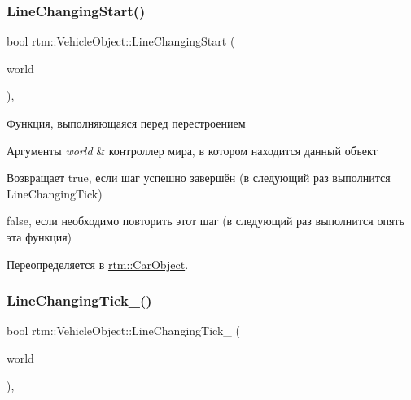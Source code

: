 \subsubsection{\texorpdfstring{Line\+Changing\+Start()}{LineChangingStart()}}
{\footnotesize\ttfamily bool rtm\+::\+Vehicle\+Object\+::\+Line\+Changing\+Start (\begin{DoxyParamCaption}\item[{\hyperlink{classrtm_1_1_world_controller}{World\+Controller} $\ast$const}]{world }\end{DoxyParamCaption})\hspace{0.3cm}{\ttfamily [protected]}, {\ttfamily [virtual]}}

Функция, выполняющаяся перед перестроением 
\begin{DoxyParams}{Аргументы}
{\em world} & контроллер мира, в котором находится данный объект \\
\hline
\end{DoxyParams}
\begin{DoxyReturn}{Возвращает}
true, если шаг успешно завершён (в следующий раз выполнится Line\+Changing\+Tick) 

false, если необходимо повторить этот шаг (в следующий раз выполнится опять эта функция) 
\end{DoxyReturn}


Переопределяется в \hyperlink{classrtm_1_1_car_object_a34063664a03d36d1308c80e064d1ae61}{rtm\+::\+Car\+Object}.

\mbox{\label{classrtm_1_1_vehicle_object_ad14f2e164f2105fbae0c982cec4aff9a}} 
\subsubsection{\texorpdfstring{Line\+Changing\+Tick\+\_\+()}{LineChangingTick\_()}}
{\footnotesize\ttfamily bool rtm\+::\+Vehicle\+Object\+::\+Line\+Changing\+Tick\+\_\+ (\begin{DoxyParamCaption}\item[{\hyperlink{classrtm_1_1_world_controller}{World\+Controller} $\ast$const}]{world }\end{DoxyParamCaption})\hspace{0.3cm}{\ttfamily [protected]}, {\ttfamily [virtual]}}

